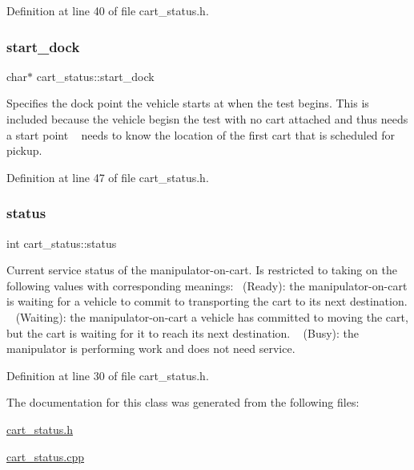 Definition at line 40 of file cart\+\_\+status.\+h.

\mbox{\label{classcart__status_a6581ba4998e76807e8837f317ff5630f}} 
\subsubsection{\texorpdfstring{start\+\_\+dock}{start\_dock}}
{\footnotesize\ttfamily char$\ast$ cart\+\_\+status\+::start\+\_\+dock\hspace{0.3cm}{\ttfamily [private]}}

Specifies the dock point the vehicle starts at when the test begins. This is included because the vehicle begisn the test with no cart attached and thus needs a start point ~\newline
needs to know the location of the first cart that is scheduled for pickup. 

Definition at line 47 of file cart\+\_\+status.\+h.

\mbox{\label{classcart__status_a641a53bcd134b03c70ddbad2309f3e1c}} 
\subsubsection{\texorpdfstring{status}{status}}
{\footnotesize\ttfamily int cart\+\_\+status\+::status\hspace{0.3cm}{\ttfamily [private]}}

Current service status of the manipulator-\/on-\/cart. Is restricted to taking on the following values with corresponding meanings\+:~ (Ready)\+: the manipulator-\/on-\/cart is waiting for a vehicle to commit to transporting the cart to its next destination. ~ (Waiting)\+: the manipulator-\/on-\/cart a vehicle has committed to moving the cart, but the cart is waiting for it to reach its next destination. ~ (Busy)\+: the manipulator is performing work and does not need service. 

Definition at line 30 of file cart\+\_\+status.\+h.



The documentation for this class was generated from the following files\+:\begin{DoxyCompactItemize}
\item 
\mbox{\hyperlink{cart__status_8h}{cart\+\_\+status.\+h}}\item 
\mbox{\hyperlink{cart__status_8cpp}{cart\+\_\+status.\+cpp}}\end{DoxyCompactItemize}

